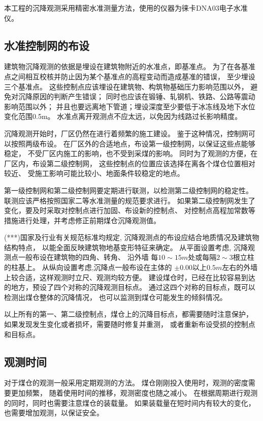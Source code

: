 本工程的沉降观测采用精密水准测量方法，使用的仪器为徕卡DNA03电子水准仪。

\subsection{水准控制网的布设}
建筑物沉降观测的依据是埋设在建筑物附近的水准点，即基准点。
为了在各基准点之间相互校核并防止因为某个基准点的高程变动而造成基准的错误，
至少埋设三个基准点。
这些控制点应该埋设在建筑物、构筑物基础压力影响范围以外，
避免对沉降原因的判断产生错误；
同时也应该在锻锤、轧钢机、铁路、公路等震动影响范围以外；
并且也要远离地下管道；埋设深度至少要低于冰冻线及地下水位变化范围0.5m。
水准点离开观测点不应太远，以免因为线路过长影响精度。

沉降观测开始时，厂区仍然在进行着频繁的施工建设。
鉴于这种情况，控制网可以按照两级布设。
在厂区外的合适地点，布设第一级控制网，以保证这些点能够稳定，
不受厂区内施工的影响，也不受到采煤的影响。
同时为了观测的方便，在厂区内，布设第二级控制网，
这些控制点的位置应该选择在离各个煤仓位置相对较近、
受施工影响可能比较小、地面条件较稳定的地点。

第一级控制网和第二级控制网要定期进行联测，以检测第二级控制网的稳定性。
联测应该严格按照国家二等水准测量的规范要求进行。
如果第二级控制网发生了变化，要及时采取对控制点进行加固、布设新的控制点、
对控制点高程加常数等措施进行处理，并考虑修正前期煤仓沉降观测值。

(***)国家及行业有关规范标准均规定,
沉降观测点的布设应结合地质情况及建筑物结构特点，
以能全面反映建筑物地基变形特征来确定。
从平面设置考虑, 沉降观测点一般布设在建筑物的四角、转角、
沿外墙 每$10\sim15m$处或每隔$2\sim3$根立柱的柱基上。
从纵向设置考虑,沉降点一般布设在主体的
$± 0.00$以上$0.5m$左右的外墙上较合适，这样观测时立尺、观测均较方便。
建设煤仓时，已经在比较容易到达的地方，预设了四个对称的沉降观测目标点。
通过这四个对称的目标点，既可以检测出煤仓整体的沉降情况，
也可以监测到煤仓可能发生的倾斜情况。

以上所有的第一、第二级控制点，煤仓上的沉降目标点，都需要随时注意保护，
如果发现发生变化或者损坏，需要随时修复并重测，
或者重新布设受损的控制点和目标点。

\subsection{观测时间}
对于煤仓的观测一般采用定期观测的方法。
煤仓刚刚投入使用时，观测的密度需要更加频繁，
随着使用时间的推移，观测密度也随之减小。
在根据周期进行观测的同时，同时也需要注意煤仓的装载量。
如果装载量在短时间内有较大的变化，也需要增加观测，以保证安全。

